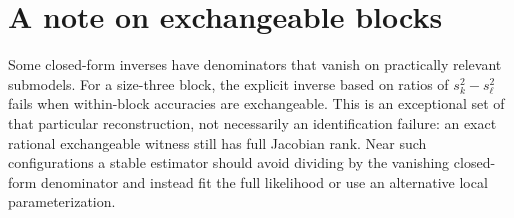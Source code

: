 \documentclass[11pt]{article}
\theoremstyle{definition}
\theoremstyle{remark}
\begin{document}
\section{A note on exchangeable blocks}

Some closed-form inverses have denominators that vanish on practically relevant submodels. For a size-three block, the explicit inverse based on ratios of $s_k^2-s_\ell^2$ fails when within-block accuracies are exchangeable. This is an exceptional set of that particular reconstruction, not necessarily an identification failure: an exact rational exchangeable witness still has full Jacobian rank. Near such configurations a stable estimator should avoid dividing by the vanishing closed-form denominator and instead fit the full likelihood or use an alternative local parameterization.
\end{document}
